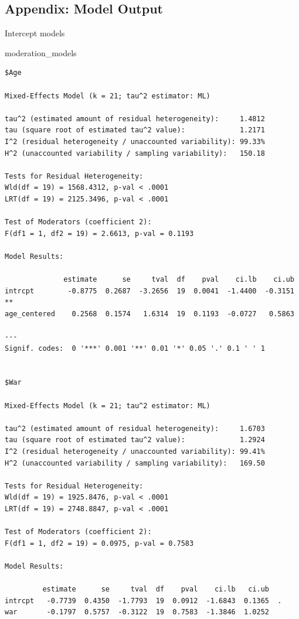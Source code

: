 \documentclass[
  letterpaper,
  DIV=11,
  numbers=noendperiod]{scrartcl}
\newenvironment{Shaded}{\begin{snugshade}}{\end{snugshade}}
\newcommand{\NormalTok}[1]{\textcolor[rgb]{0.00,0.23,0.31}{#1}}
\begin{document}
\subsection{Appendix: Model Output}\label{appendix-model-output}

Intercept models

\begin{Shaded}
\begin{Highlighting}[]
\NormalTok{moderation\_models}
\end{Highlighting}
\end{Shaded}

\begin{verbatim}
$Age

Mixed-Effects Model (k = 21; tau^2 estimator: ML)

tau^2 (estimated amount of residual heterogeneity):     1.4812
tau (square root of estimated tau^2 value):             1.2171
I^2 (residual heterogeneity / unaccounted variability): 99.33%
H^2 (unaccounted variability / sampling variability):   150.18

Tests for Residual Heterogeneity:
Wld(df = 19) = 1568.4312, p-val < .0001
LRT(df = 19) = 2125.3496, p-val < .0001

Test of Moderators (coefficient 2):
F(df1 = 1, df2 = 19) = 2.6613, p-val = 0.1193

Model Results:

              estimate      se     tval  df    pval    ci.lb    ci.ub     
intrcpt        -0.8775  0.2687  -3.2656  19  0.0041  -1.4400  -0.3151  ** 
age_centered    0.2568  0.1574   1.6314  19  0.1193  -0.0727   0.5863     

---
Signif. codes:  0 '***' 0.001 '**' 0.01 '*' 0.05 '.' 0.1 ' ' 1


$War

Mixed-Effects Model (k = 21; tau^2 estimator: ML)

tau^2 (estimated amount of residual heterogeneity):     1.6703
tau (square root of estimated tau^2 value):             1.2924
I^2 (residual heterogeneity / unaccounted variability): 99.41%
H^2 (unaccounted variability / sampling variability):   169.50

Tests for Residual Heterogeneity:
Wld(df = 19) = 1925.8476, p-val < .0001
LRT(df = 19) = 2748.8847, p-val < .0001

Test of Moderators (coefficient 2):
F(df1 = 1, df2 = 19) = 0.0975, p-val = 0.7583

Model Results:

         estimate      se     tval  df    pval    ci.lb   ci.ub    
intrcpt   -0.7739  0.4350  -1.7793  19  0.0912  -1.6843  0.1365  . 
war       -0.1797  0.5757  -0.3122  19  0.7583  -1.3846  1.0252    


\end{verbatim}
\end{document}
